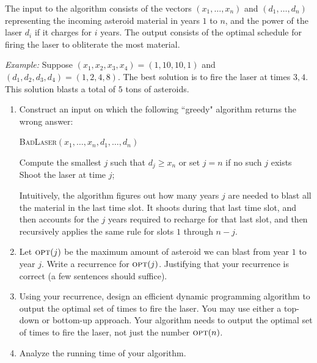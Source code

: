 \documentclass[11pt]{article}
\theoremstyle{definition}
\begin{document}
\begin{enumerate}[leftmargin=0pt, itemsep=3ex]
The input to the algorithm consists of the vectors $(x_1,\ldots,x_n)$ and $(d_1,\ldots,d_n)$ representing the incoming asteroid material in years $1$ to $n$, and the power of the laser $d_i$ if it charges for $i$ years.  The output consists of the optimal schedule for firing the laser to obliterate the most material.

\medskip
\emph{Example:} Suppose $(x_1,x_2,x_3,x_4)=(1,10,10,1)$ and $(d_1,d_2,d_3,d_4) = (1,2,4,8)$.  
The best solution is to fire the laser at times $3,4$.  This solution blasts a total of $5$ tons of asteroids.

    \begin{enumerate}[leftmargin=0pt, itemsep=3ex]
    \item Construct an input on which  the following ``greedy" algorithm returns the wrong answer:
    
    \begin{algorithm}[h!]
    \DontPrintSemicolon
    \caption{\textsc{BadLaser}$(x_1,\ldots,x_n,d_1,\ldots,d_n)$}
    Compute the smallest $j$ such that $d_j\geq x_n$ or set $j = n$ if no such $j$ exists \;
    Shoot the laser at time $j$;
    
    \end{algorithm}
    Intuitively, the algorithm figures out how many years $j$ are needed to blast all the material in the last time slot.  It shoots during that last time slot, and then accounts for the $j$ years required to recharge for that last slot, and then recursively applies the same rule for slots $1$ through $n-j$. 
    
    \item Let $\textsc{opt}(j)$ be the maximum amount of asteroid we can blast from year $1$ to year $j$.  Write a recurrence for $\textsc{opt}(j)$. Justifying that your recurrence is correct (a few sentences should suffice).

    \item Using your recurrence, design an efficient dynamic programming algorithm to output the optimal set of times to fire the laser.  You may use either a top-down or bottom-up approach.  Your algorithm needs to output the optimal set of times to fire the laser, not just the number $\textsc{opt}(n)$.

    \item Analyze the running time of your algorithm.
    \end{enumerate}
\end{enumerate}
\end{document}
